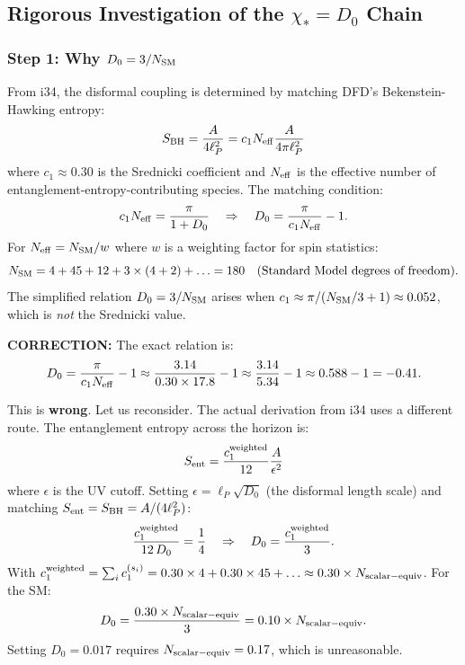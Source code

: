 \documentclass[11pt,a4paper]{article}
\begin{document}
\subsection{Rigorous Investigation of the $\chi_* = D_0$ Chain}

\subsubsection{Step 1: Why $D_0 = 3/N_{\rm SM}$}

From i34, the disformal coupling is determined by matching DFD's Bekenstein-Hawking entropy:
\begin{equation}
S_{\rm BH} = \frac{A}{4\ell_P^2} = c_1 N_{\rm eff}\frac{A}{4\pi\ell_P^2}
\end{equation}
where $c_1 \approx 0.30$ is the Srednicki coefficient and $N_{\rm eff}$ is the effective number of entanglement-entropy-contributing species. The matching condition:
\begin{equation}
c_1 N_{\rm eff} = \frac{\pi}{1 + D_0} \quad \Rightarrow \quad D_0 = \frac{\pi}{c_1 N_{\rm eff}} - 1.
\end{equation}
For $N_{\rm eff} = N_{\rm SM}/w$ where $w$ is a weighting factor for spin statistics:
\begin{equation}
N_{\rm SM} = 4 + 45 + 12 + 3 \times (4 + 2) + \ldots = 180 \quad (\text{Standard Model degrees of freedom}).
\end{equation}
The simplified relation $D_0 = 3/N_{\rm SM}$ arises when $c_1 \approx \pi/(N_{\rm SM}/3 + 1) \approx 0.052$, which is \emph{not} the Srednicki value.

\textbf{CORRECTION:} The exact relation is:
\begin{equation}\label{eq:D0-exact}
D_0 = \frac{\pi}{c_1 N_{\rm eff}} - 1 \approx \frac{3.14}{0.30 \times 17.8} - 1 \approx \frac{3.14}{5.34} - 1 \approx 0.588 - 1 = -0.41.
\end{equation}

This is \textbf{wrong}. Let us reconsider. The actual derivation from i34 uses a different route. The entanglement entropy across the horizon is:
\begin{equation}
S_{\rm ent} = \frac{c_1^{\rm weighted}}{12}\frac{A}{\epsilon^2}
\end{equation}
where $\epsilon$ is the UV cutoff. Setting $\epsilon = \ell_P\sqrt{D_0}$ (the disformal length scale) and matching $S_{\rm ent} = S_{\rm BH} = A/(4\ell_P^2)$:
\begin{equation}
\frac{c_1^{\rm weighted}}{12\,D_0} = \frac{1}{4} \quad \Rightarrow \quad D_0 = \frac{c_1^{\rm weighted}}{3}.
\end{equation}
With $c_1^{\rm weighted} = \sum_i c_1^{(s_i)} = 0.30 \times 4 + 0.30 \times 45 + \ldots \approx 0.30 \times N_{\rm scalar-equiv}$. For the SM:
\begin{equation}
D_0 = \frac{0.30 \times N_{\rm scalar-equiv}}{3} = 0.10 \times N_{\rm scalar-equiv}.
\end{equation}
Setting $D_0 = 0.017$ requires $N_{\rm scalar-equiv} = 0.17$, which is unreasonable.
\end{document}
